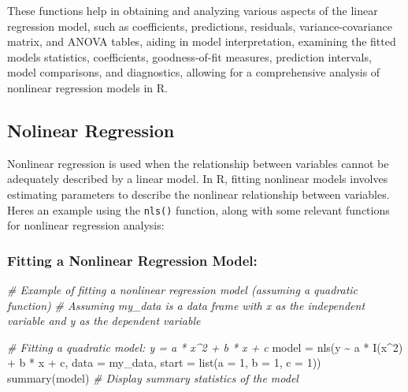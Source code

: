 \documentclass[
]{article}
\newenvironment{Shaded}{}{}
\newcommand{\AttributeTok}[1]{\textcolor[rgb]{0.49,0.56,0.16}{#1}}
\newcommand{\CommentTok}[1]{\textcolor[rgb]{0.38,0.63,0.69}{\textit{#1}}}
\newcommand{\DecValTok}[1]{\textcolor[rgb]{0.25,0.63,0.44}{#1}}
\newcommand{\FunctionTok}[1]{\textcolor[rgb]{0.02,0.16,0.49}{#1}}
\newcommand{\NormalTok}[1]{#1}
\newcommand{\OtherTok}[1]{\textcolor[rgb]{0.00,0.44,0.13}{#1}}
\newcommand{\SpecialCharTok}[1]{\textcolor[rgb]{0.25,0.44,0.63}{#1}}
\begin{document}
These functions help in obtaining and analyzing various aspects of the
linear regression model, such as coefficients, predictions, residuals,
variance-covariance matrix, and ANOVA tables, aiding in model
interpretation, examining the fitted model\textquotesingle s statistics,
coefficients, goodness-of-fit measures, prediction intervals, model
comparisons, and diagnostics, allowing for a comprehensive analysis of
nonlinear regression models in R.

\hypertarget{nolinear-regression}{%
\subsection{Nolinear Regression}\label{nolinear-regression}}

Nonlinear regression is used when the relationship between variables
cannot be adequately described by a linear model. In R, fitting
nonlinear models involves estimating parameters to describe the
nonlinear relationship between variables. Here\textquotesingle s an
example using the \texttt{nls()} function, along with some relevant
functions for nonlinear regression analysis:

\hypertarget{fitting-a-nonlinear-regression-model}{%
\subsubsection{Fitting a Nonlinear Regression
Model:}\label{fitting-a-nonlinear-regression-model}}

\begin{Shaded}
\begin{Highlighting}[]
\CommentTok{\# Example of fitting a nonlinear regression model (assuming a quadratic function)}
\CommentTok{\# Assuming \textquotesingle{}my\_data\textquotesingle{} is a data frame with \textquotesingle{}x\textquotesingle{} as the independent variable and \textquotesingle{}y\textquotesingle{} as the dependent variable}

\CommentTok{\# Fitting a quadratic model: y = a * x\^{}2 + b * x + c}
\NormalTok{model }\OtherTok{=} \FunctionTok{nls}\NormalTok{(y }\SpecialCharTok{\textasciitilde{}}\NormalTok{ a }\SpecialCharTok{*} \FunctionTok{I}\NormalTok{(x}\SpecialCharTok{\^{}}\DecValTok{2}\NormalTok{) }\SpecialCharTok{+}\NormalTok{ b }\SpecialCharTok{*}\NormalTok{ x }\SpecialCharTok{+}\NormalTok{ c, }\AttributeTok{data =}\NormalTok{ my\_data, }\AttributeTok{start =} \FunctionTok{list}\NormalTok{(}\AttributeTok{a =} \DecValTok{1}\NormalTok{, }\AttributeTok{b =} \DecValTok{1}\NormalTok{, }\AttributeTok{c =} \DecValTok{1}\NormalTok{))}
\FunctionTok{summary}\NormalTok{(model)  }\CommentTok{\# Display summary statistics of the model}
\end{Highlighting}
\end{Shaded}
\end{document}
